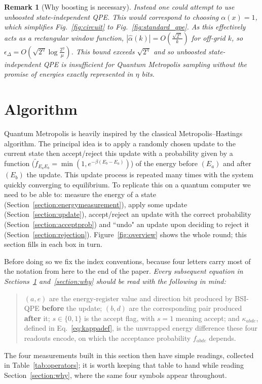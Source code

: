 \documentclass[aps,floatfix,10pt,amssymb,amsfont,amsmath,superscriptaddress,float,nofootinbib,longbibliography,nobalancelastpage,twocolumn]{revtex4-2}
\newtheorem{remark}{Remark}
\begin{document}
\begin{remark}[Why boosting is necessary]
\label{remark:boosting}
Instead one could attempt to use unboosted state-independent QPE. This would correspond to choosing $\alpha(x)=1$, which simplifies Fig.~\ref{fig:circuit} to Fig.~\ref{fig:standard_qpe}. As this effectively acts as a rectangular window function, $|\hat\alpha(k)| = O(\frac{\sqrt{2^{\eta}}}{k})$ for off-grid $k$, so $\epsilon_{\Delta} = O(\sqrt{2^{\eta}}\log \frac{2^\eta}{\mu})$. This bound exceeds $\sqrt{2^{\eta}}$ and so unboosted state-independent QPE is insufficient for Quantum Metropolis sampling without the promise of energies exactly represented in $\eta$ bits.
\end{remark}
\section{Algorithm}
\label{section:algorithm}
Quantum Metropolis is heavily inspired by the classical Metropolis--Hastings algorithm. The principal idea is to apply a randomly chosen update to the current state then accept/reject this update with a probability given by a function ($\tilde{f}_{E_aE_b}=\min(1, e^{-\beta(E_b-E_a)})$) of the energy before $(E_a)$ and after $(E_b)$ the update. This update process is repeated many times with the system quickly converging to equilibrium. To replicate this on a quantum computer we need to be able to: measure the energy of a state (Section~\ref{section:energymeasurement}), apply some update (Section~\ref{section:update}), accept/reject an update with the correct probability (Section~\ref{section:acceptprob}) and ``undo" an update upon deciding to reject it (Section~\ref{section:rejection}).
Figure~\ref{fig:overview} shows the whole round; this section fills in each box in turn.

Before doing so we fix the index conventions, because four letters carry most of the notation from here to the end of the paper. \emph{Every subsequent equation in Sections~\ref{section:algorithm} and~\ref{section:why} should be read with the following in mind:}
\begin{quote}
$(a,e)$ are the energy-register value and direction bit produced by BSI-QPE \textbf{before} the update; $(b,d)$ are the corresponding pair produced \textbf{after} it; $s\in\{0,1\}$ is the accept flag, with $s=1$ meaning accept; and $\kappa_{abde}$, defined in Eq.~\eqref{eq:kappadef}, is the unwrapped energy difference these four readouts encode, on which the acceptance probability $f_{abde}$ depends.
\end{quote}
The four measurements built in this section then have simple readings, collected in Table~\ref{tab:operators}; it is worth keeping that table to hand while reading Section~\ref{section:why}, where the same four symbols appear throughout.
\end{document}
